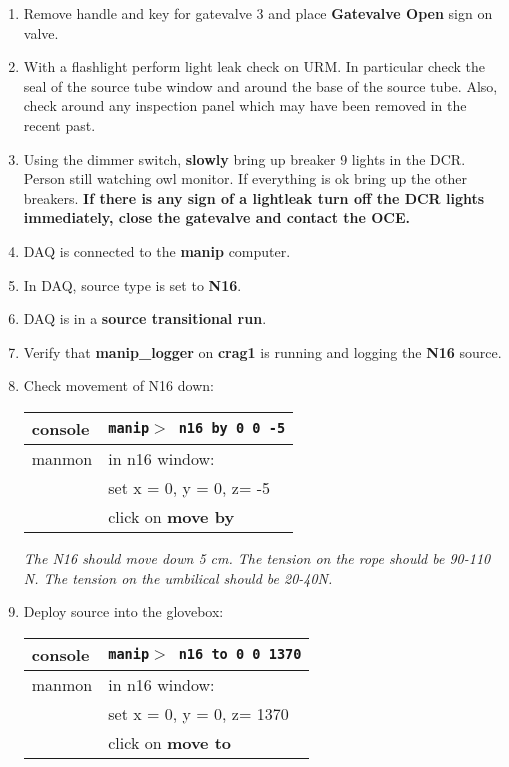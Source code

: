 \begin{enumerate}
 \item\checkbox Remove handle and key for gatevalve 3 and place {\bf Gatevalve Open}
sign on valve.

 \item\checkbox With a flashlight perform light leak check on URM.  In particular
   check the seal of the source tube window and around the base of the source tube.
   Also, check around any inspection panel which may have been removed in the recent past.

 \item\checkbox Using the dimmer switch, { \bf slowly } bring up breaker 9 lights in
   the DCR.  Person still watching owl monitor. If everything is ok bring up the other
    breakers. {\bf If there is any sign of a lightleak turn off the DCR lights
immediately, close the gatevalve and contact the OCE.}




 \item\checkbox DAQ is connected to the {\bf manip} computer.

 \item \checkbox In DAQ, source type is set to {\bf N16}.

 \item\checkbox DAQ is in a {\bf source transitional run}.

 \item \checkbox Verify that {\bf manip\_logger} on {\bf crag1}
                 is running and logging the {\bf N16}  source.





 \item \checkbox Check movement of N16 down:
  \begin{center}
  \begin{tabular}{|l|l|}
  \hline
  console & {\tt manip$>$ n16 by 0 0 -5} \\
  \hline
  manmon  & in n16 window: \\
          & set x = 0, y = 0, z= -5\\
          & click on {\bf move by} \\
  \hline
  \end{tabular}
  \end{center}
  \small
  {\em 
    The N16 should move down 5 cm.  The tension on the rope
    should be 90-110 N.  The tension on the umbilical should be
    20-40N.
  }
  \normalsize

 \item \checkbox Deploy source into the glovebox:
  \begin{center}
  \begin{tabular}{|l|l|}
  \hline
  console & {\tt manip$>$ n16 to 0 0 1370} \\
  \hline
  manmon  & in n16 window: \\
          & set x = 0, y = 0, z= 1370\\
          & click on {\bf move to} \\
  \hline
  \end{tabular}
  \end{center}

\end{enumerate}



